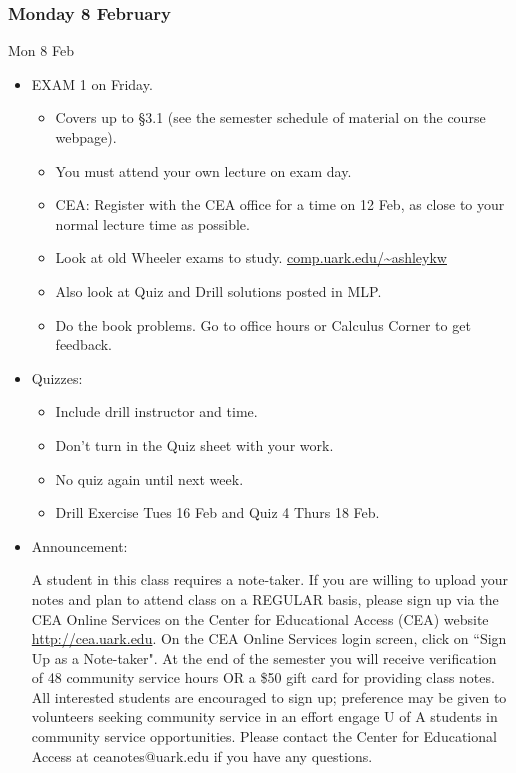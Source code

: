 \documentclass[cal1spr16Lectures.tex]{subfiles}
\begin{document}

\subsubsection{\bf Monday 8 February}
\begin{frame}[allowframebreaks]{Mon 8 Feb}
\begin{itemize}\footnotesize
\item EXAM 1 on Friday.  
\begin{itemize}\footnotesize
	\item Covers up to \S 3.1 (see the semester schedule of material on the course webpage). 
	\item \alert{You must attend your own lecture on exam day.}  
	\item CEA: Register with the CEA office for a time on 12 Feb, as close to your normal lecture time as possible.
	\item Look at old Wheeler exams to study.
	\url{comp.uark.edu/~ashleykw}
	\item Also look at Quiz and Drill solutions posted in MLP.
	\item Do the book problems.  Go to office hours or Calculus Corner to get feedback.
\end{itemize}	
\framebreak
\item Quizzes: 
\begin{itemize}
	\item Include drill instructor and time.
	\item Don't turn in the Quiz sheet with your work.
	\item No quiz again until next week.
	\item Drill Exercise Tues 16 Feb and Quiz 4 Thurs 18 Feb.
\end{itemize}
\framebreak
\item  Announcement: 

\alert{A student in this class requires a note-taker. If you are willing to upload your notes and plan to attend class on a REGULAR basis, please sign up via the CEA Online Services on the Center for Educational Access (CEA) website \url{http://cea.uark.edu}. On the CEA Online Services login screen, click on ``Sign Up as a Note-taker". At the end of the semester you will receive verification of 48 community service hours OR a \$50 gift card for providing class notes. All interested students are encouraged to sign up; preference may be given to volunteers seeking community service in an effort engage U of A students in community service opportunities. Please contact the Center for Educational Access at ceanotes@uark.edu if you have any questions.}

\end{itemize}
\end{frame}
\end{document}
